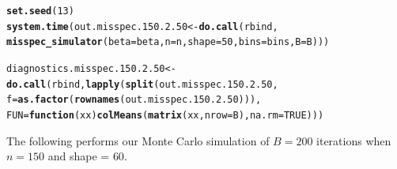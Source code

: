 \documentclass[11pt]{article}\usepackage[]{graphicx}\usepackage[]{color}
\makeatletter
\newcommand{\hlnum}[1]{\textcolor[rgb]{0.686,0.059,0.569}{#1}}%
\newcommand{\hlstd}[1]{\textcolor[rgb]{0.345,0.345,0.345}{#1}}%
\newcommand{\hlkwa}[1]{\textcolor[rgb]{0.161,0.373,0.58}{\textbf{#1}}}%
\newcommand{\hlkwb}[1]{\textcolor[rgb]{0.69,0.353,0.396}{#1}}%
\newcommand{\hlkwc}[1]{\textcolor[rgb]{0.333,0.667,0.333}{#1}}%
\newcommand{\hlkwd}[1]{\textcolor[rgb]{0.737,0.353,0.396}{\textbf{#1}}}%
\newenvironment{kframe}{%
 \def\at@end@of@kframe{}%
 \ifinner\ifhmode%
  \def\at@end@of@kframe{\end{minipage}}%
  \begin{minipage}{\columnwidth}%
 \fi\fi%
 \def\FrameCommand##1{\hskip\@totalleftmargin \hskip-\fboxsep
 \colorbox{shadecolor}{##1}\hskip-\fboxsep
     \hskip-\linewidth \hskip-\@totalleftmargin \hskip\columnwidth}%
 \MakeFramed {\advance\hsize-\width
   \@totalleftmargin\z@ \linewidth\hsize
   \@setminipage}}%
 {\par\unskip\endMakeFramed%
 \at@end@of@kframe}
\newenvironment{knitrout}{}{} %
\makeatother
\begin{document}
\begin{knitrout}
\color{fgcolor}\begin{kframe}
\begin{alltt}
\hlkwd{set.seed}\hlstd{(}\hlnum{13}\hlstd{)}
\hlkwd{system.time}\hlstd{(out.misspec.150.2.50} \hlkwb{<-} \hlkwd{do.call}\hlstd{(rbind,}
  \hlkwd{misspec_simulator}\hlstd{(}\hlkwc{beta} \hlstd{= beta,} \hlkwc{n} \hlstd{= n,} \hlkwc{shape} \hlstd{=} \hlnum{50}\hlstd{,} \hlkwc{bins} \hlstd{= bins,} \hlkwc{B} \hlstd{= B)))}
\end{alltt}


{\ttfamily\noindent\bfseries\color{errorcolor}{\#\# Error in chol.default(crossprod(x) + lambda[j] * diag(v)): the leading minor of order 5 is not positive definite}}

{\ttfamily\noindent\itshape\color{messagecolor}{\#\# Timing stopped at: 0.716 0 0.716}}\begin{alltt}
\hlstd{diagnostics.misspec.150.2.50} \hlkwb{<-} \hlkwd{do.call}\hlstd{(rbind,} \hlkwd{lapply}\hlstd{(}\hlkwd{split}\hlstd{(out.misspec.150.2.50,}
  \hlkwc{f} \hlstd{=} \hlkwd{as.factor}\hlstd{(}\hlkwd{rownames}\hlstd{(out.misspec.150.2.50))),}
  \hlkwc{FUN} \hlstd{=} \hlkwa{function}\hlstd{(}\hlkwc{xx}\hlstd{)} \hlkwd{colMeans}\hlstd{(}\hlkwd{matrix}\hlstd{(xx,} \hlkwc{nrow} \hlstd{= B),} \hlkwc{na.rm} \hlstd{=} \hlnum{TRUE}\hlstd{)))}
\end{alltt}


{\ttfamily\noindent\bfseries\color{errorcolor}{\#\# Error in split(out.misspec.150.2.50, f = as.factor(rownames(out.misspec.150.2.50))): object 'out.misspec.150.2.50' not found}}\end{kframe}
\end{knitrout}


The following performs our Monte Carlo simulation of $B = 200$ iterations 
when $n = 150$ and shape = $60$.
\end{document}
